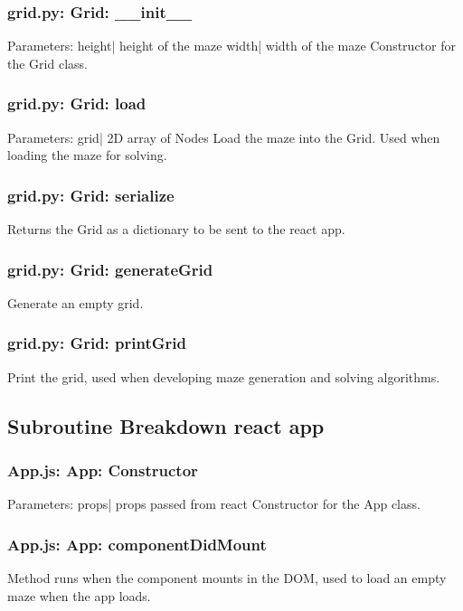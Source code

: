 \documentclass[titlepage]{article}
\begin{document}
\subsubsection{grid.py: Grid: \_\_init\_\_}
Parameters:\newline
\indent height| height of the maze\newline
\indent width| width of the maze\newline
Constructor for the Grid class.

\subsubsection{grid.py: Grid: load}
Parameters:\newline
\indent grid| 2D array of Nodes\newline
Load the maze into the Grid. Used when loading the maze for solving.

\subsubsection{grid.py: Grid: serialize}
Returns the Grid as a dictionary to be sent to the react app.


\subsubsection{grid.py: Grid: generateGrid}
Generate an empty grid.

\subsubsection{grid.py: Grid: printGrid}
Print the grid, used when developing maze generation and solving algorithms.

\subsection{Subroutine Breakdown react app}
\subsubsection{App.js: App: Constructor}
Parameters:\newline
\indent props| props passed from react\newline
Constructor for the App class.

\subsubsection{App.js: App: componentDidMount}
Method runs when the component mounts in the DOM, used to load an empty maze when the app loads.
\end{document}
